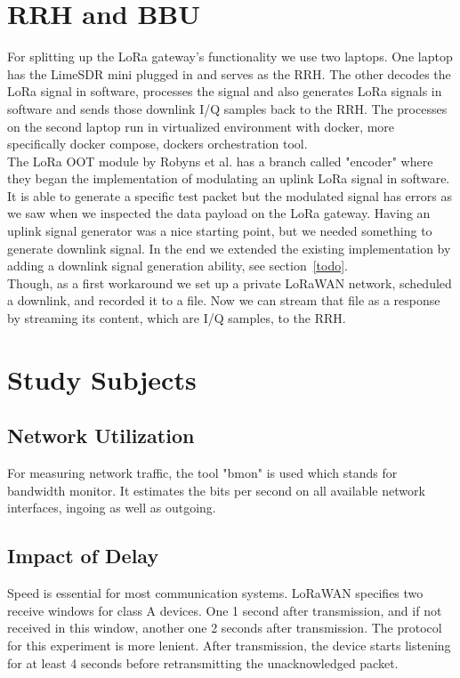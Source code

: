 \section{RRH and BBU}
For splitting up the LoRa gateway's functionality we use two laptops. 
One laptop has the LimeSDR mini plugged in and serves as the RRH. The other decodes the LoRa
signal in software, processes the signal and also generates LoRa signals in software and sends those downlink I/Q samples back to the RRH.
The processes on the second laptop run in virtualized environment with docker, more specifically docker compose, dockers orchestration tool.
\\
The LoRa OOT module by Robyns et al. has a branch called "encoder" where they began the implementation of modulating an uplink LoRa signal in software.
It is able to generate a specific test packet but the modulated signal has errors as we saw when we inspected the data payload on the LoRa gateway.
Having an uplink signal generator was a nice starting point, but we needed something to generate downlink signal. In the end we extended the existing implementation
by adding a downlink signal generation ability, see section~\ref{todo}.
\\
Though, as a first workaround we set up a private LoRaWAN network, scheduled a downlink, and recorded it to a file. Now we can stream that file as a response by streaming its content,
which are I/Q samples, to the RRH.


\section{Study Subjects}
\subsection{Network Utilization}
For measuring network traffic, the tool "bmon" is used which stands for bandwidth monitor.
It estimates the bits per second on all available network interfaces, ingoing as well as outgoing. 
\subsection{Impact of Delay}
Speed is essential for most communication systems.
LoRaWAN specifies two receive windows for class A devices. One 1 second after transmission, and if not
received in this window, another one 2 seconds after transmission.
The protocol for this experiment is more lenient. After transmission, the device starts listening
for at least 4 seconds before retransmitting the unacknowledged packet.
